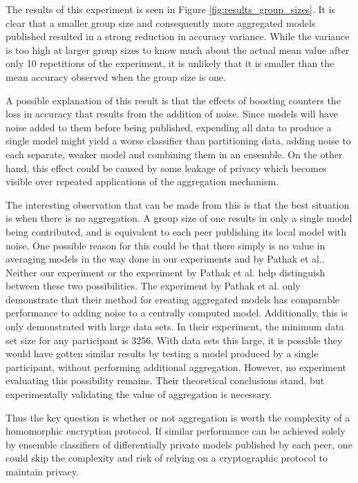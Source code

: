 The results of this experiment is seen in Figure \ref{fig:results_group_sizes}. It is clear that a smaller group size and consequently more aggregated models published resulted in a strong reduction in accuracy variance. While the variance is too high at larger group sizes to know much about the actual mean value after only 10 repetitions of the experiment, it is unlikely that it is smaller than the mean accuracy observed when the group size is one. 

A possible explanation of this result is that the effects of  boosting counters the loss in accuracy that results from the addition of noise. Since models will have noise added to them before being published, expending all data to produce a single model might yield a worse classifier than partitioning data, adding noise to each separate, weaker model and combining them in an ensemble. On the other hand, this effect could be caused by some leakage of privacy which becomes visible over repeated applications of the aggregation mechanism.  

The interesting observation that can be made from this is that the best situation is when there is no aggregation. A group size of one results in only a single model being contributed, and is equivalent to each peer publishing its local model with noise. One possible reason for this could be that there simply is no value in averaging models in the way done in our experiments and by Pathak et al.\cite{pathak2010diffprivhomo}. Neither our experiment or the experiment by Pathak et al. help distinguish between these two possibilities. The experiment by Pathak et al. only demonstrate that their method for creating aggregated models has comparable performance to adding noise to a centrally computed model. Additionally, this is only demonstrated with large data sets. In their experiment, the minimum data set size for any participant is 3256. With data sets this large, it is possible they would have gotten similar results by testing a model produced by a single participant, without performing additional aggregation. However, no experiment evaluating this possibility remains. Their theoretical conclusions stand, but experimentally validating the value of aggregation is necessary.

Thus the key question is whether or not aggregation is worth the complexity of a homomorphic encryption protocol. If similar performance can be achieved solely by ensemble classifiers of differentially private models published by each peer, one could skip the complexity and risk of relying on a cryptographic protocol to maintain privacy.

